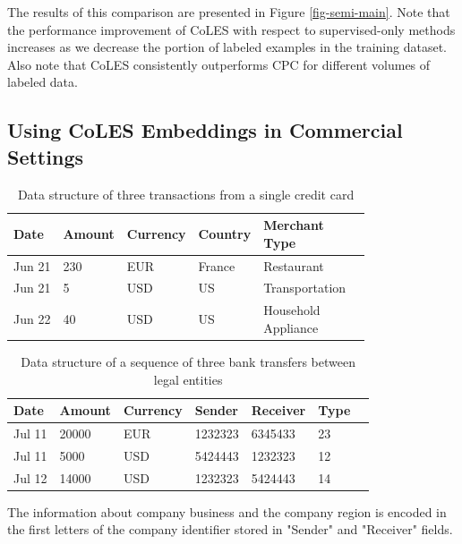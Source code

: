 \documentclass[sigconf]{acmart}
\begin{document}
The results of this comparison are presented in Figure \ref{fig-semi-main}. Note that the performance improvement of CoLES with respect to supervised-only methods increases as we decrease the portion of labeled examples in the training dataset. Also note that CoLES consistently outperforms CPC for different volumes of labeled data.

\subsection{Using CoLES Embeddings in Commercial Settings}

\begin{table}
\centering
\caption{Data structure of three transactions from a single credit card}
\begin{tabular}{llllll}
\toprule
\textbf{Date} & \textbf{Amount} & \textbf{Currency} & \textbf{Country} & \makecell{\textbf{Merchant} \\ \textbf{Type}} \\
\midrule
Jun 21 & 230 & EUR & France & Restaurant \\
Jun 21 & 5 & USD & US & Transportation \\
Jun 22 & 40 & USD & US & \makecell[l]{Household \\ Appliance} \\
\bottomrule
\end{tabular}
\label{tab-tr-data}
\end{table}


\begin{table}
\centering
\caption{Data structure of a sequence of three bank transfers between legal entities}
\begin{tabular}{lllllll}
\toprule
\textbf{Date} & \textbf{Amount} & \textbf{Currency} & \textbf{Sender} & \textbf{Receiver} & \textbf{Type} \\
\midrule
Jul 11 & 20000 & EUR & 1232323 & 6345433 & 23 \\
Jul 11 & 5000 & USD & 5424443 & 1232323 & 12 \\
Jul 12 & 14000 & USD & 1232323 & 5424443 & 14 \\
\bottomrule
\end{tabular}
\small{The information about company business and the company region is encoded in the first letters of the company identifier stored in "Sender" and "Receiver" fields.}
\label{tab-org-tr-data}
\end{table}
\end{document}
